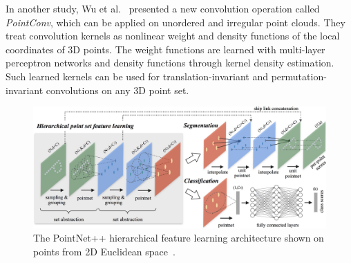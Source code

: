 \vspace{5mm}

\noindent In another study, Wu et al.~\cite{DBLP:journals/corr/abs-1811-07246} presented a new convolution operation called \textit{PointConv}, which can be applied on unordered and irregular point clouds. They treat convolution kernels as nonlinear weight and density functions of the local coordinates of 3D points. The weight functions are learned with multi-layer perceptron networks and density functions through kernel density estimation. Such learned kernels can be used for translation-invariant and permutation-invariant convolutions on any 3D point set. \par
\vspace{5mm}
\begin{figure}[H]
\begin{center}
  \includegraphics[width=\textwidth]{images/related_work/pointnet2.jpg}
  \caption[The PointNet++ hierarchical feature learning architecture.]{The PointNet++ hierarchical feature learning architecture shown on points from 2D Euclidean space~\cite{DBLP:journals/corr/QiYSG17}.}
  \label{fig:Pointnet2}
\end{center}
\end{figure}

